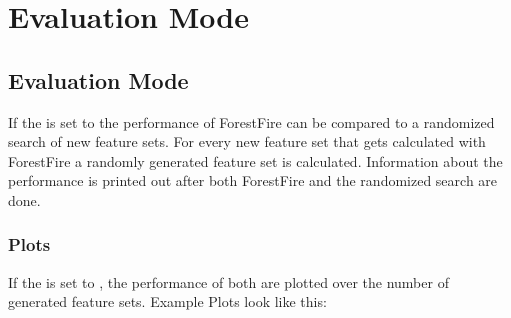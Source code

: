 \documentclass[letterpaper,10pt,english]{sphinxmanual}
\begin{document}
\chapter{Evaluation Mode}
\label{\detokenize{index:demo}}\label{\detokenize{index:evaluation-mode}}

\section{Evaluation Mode}
\label{\detokenize{Evaluation:evaluation-mode}}\label{\detokenize{Evaluation::doc}}
If the {\hyperref[\detokenize{execution:hyperparameters}]{}}  is set to  the performance of ForestFire can be compared to a randomized search of new feature sets.
For every new feature set that gets calculated with ForestFire a randomly generated feature set is calculated.
Information about the performance is printed out after both ForestFire and the randomized search are done.


\subsection{Plots}
\label{\detokenize{Evaluation:plots}}
If the {\hyperref[\detokenize{execution:hyperparameters}]{}}  is set to , the performance of both are plotted over the number of generated feature sets.
Example Plots look like this:
\begin{figure}[htbp]
\centering

\noindent{}
\end{figure}
\begin{figure}[htbp]
\centering

\noindent{}
\end{figure}
\end{document}

